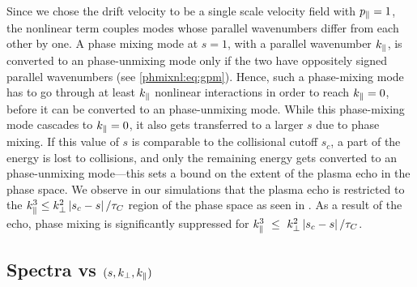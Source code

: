     Since we chose the drift velocity to be a single scale velocity field with $p_\parallel=1$,
    the nonlinear term couples modes whose parallel wavenumbers differ from each other by
    one. A phase mixing mode at $s=1$, with a parallel wavenumber $k_\parallel$, is converted to
    an phase-unmixing mode only if the two have oppositely signed parallel wavenumbers
    (see \eqref{phmixnl:eq:gpm}). Hence, such a phase-mixing mode has to go through at least
    $k_\parallel$ nonlinear interactions in order to reach $k_\parallel=0$, before it can be
    converted to an phase-unmixing mode.
    While this phase-mixing mode cascades to
    $k_\parallel=0$, it also gets transferred to a larger $s$ due to phase mixing. If this value
    of $s$
    is comparable to the collisional cutoff $s_c$, a part of the energy is lost to
    collisions, and only the remaining energy gets converted to an phase-unmixing mode---this sets a bound on the extent of the plasma echo in the phase space. 
    We observe in our simulations that the plasma echo is restricted to the $k_\parallel^3 \leq
    k_\perp^2 \left|s_c-s\right|/\tau_C$ region of the phase space as seen in
    .
    As a result of the echo, phase mixing is significantly suppressed for $k_\parallel^3~\leq~k_\perp^2 \left|s_c-s\right|/\tau_C$. 

\subsection{Spectra vs $(s, k_\perp, k_\parallel)$}

